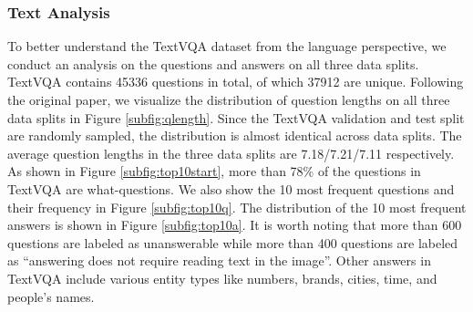 \subsubsection{Text Analysis}

To better understand the TextVQA dataset from the language perspective, we conduct an analysis on the questions and answers on all three data splits. TextVQA contains 45336 questions in total, of which 37912 are unique. Following the original paper, we visualize the distribution of question lengths on all three data splits in Figure \ref{subfig:qlength}. Since the TextVQA validation and test split are randomly sampled, the distribution is almost identical across data splits. The average question lengths in the three data splits are 7.18/7.21/7.11 respectively. As shown in Figure \ref{subfig:top10start}, more than 78\% of the questions in TextVQA are what-questions. We also show the 10 most frequent questions and their frequency in Figure \ref{subfig:top10q}. The distribution of the 10 most frequent answers is shown in Figure \ref{subfig:top10a}. It is worth noting that more than 600 questions are labeled as unanswerable while more than 400 questions are labeled as ``answering does not require reading text in the image''. Other answers in TextVQA include various entity types like numbers, brands, cities, time, and people's names.

